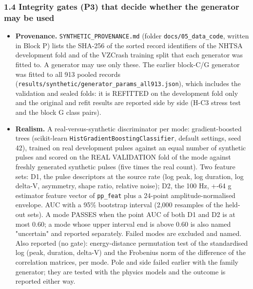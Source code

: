 \subsubsection*{1.4 Integrity gates (P3) that decide whether the generator may be used}
\begin{itemize}
\item \textbf{Provenance.} \texttt{SYNTHETIC\_PROVENANCE.md} (folder \texttt{docs/05\_data\_code}, written in Block P) lists the SHA-256 of the sorted record identifiers of the NHTSA development fold and of the VZCrash training split that each generator was fitted to. A generator may use only these. The earlier block-C/G generator was fitted to all 913 pooled records (\texttt{results/synthetic/generator\_params\_all913.json}), which includes the validation and sealed folds: it is REFITTED on the development fold only and the original and refit results are reported side by side (H-C3 stress test and the block G class pairs).
\item \textbf{Realism.} A real-versus-synthetic discriminator per mode: gradient-boosted trees (scikit-learn \texttt{HistGradientBoostingClassifier}, default settings, seed 42), trained on real development pulses against an equal number of synthetic pulses and scored on the REAL VALIDATION fold of the mode against freshly generated synthetic pulses (five times the real count). Two feature sets: D1, the pulse descriptors at the source rate (log peak, log duration, log delta-V, asymmetry, shape ratio, relative noise); D2, the 100 Hz, +-64 g estimator feature vector of \texttt{pp\_feat} plus a 24-point amplitude-normalised envelope. AUC with a 95\% bootstrap interval (2,000 resamples of the held-out sets). A mode PASSES when the point AUC of both D1 and D2 is at most 0.60; a mode whose upper interval end is above 0.60 is also named "uncertain" and reported separately. Failed modes are excluded and named. Also reported (no gate): energy-distance permutation test of the standardised log (peak, duration, delta-V) and the Frobenius norm of the difference of the correlation matrices, per mode. Pole and side failed earlier with the family generator; they are tested with the physics models and the outcome is reported either way.

\end{itemize}

